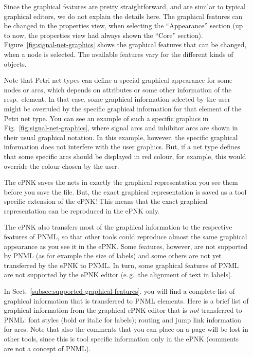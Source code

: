 Since the graphical features are pretty straightforward, and are similar
to typical graphical editors, we do not explain the details here. The
graphical features can be changed in the properties view, when selecting
the ``Appearance'' section (up to now, the properties view had always
shown the ``Core'' section). Figure~\ref{fig:signal-net-graphics} shows
the graphical features that can be changed, when a node is selected. The
available features vary for the different kinds of objects.

Note that Petri net types can define a special graphical appearance for
some nodes or arcs, which depends on attributes or some other information
of the resp.\ element. In that case, some graphical information selected by
the user might be overruled by the specific graphical information for that
element of the Petri net type. You can see an example of such a specific
graphics in Fig.~\ref{fig:signal-net-graphics}, where signal arcs and
inhibitor arcs are shown in their usual graphical notation. In this example,
however, the specific graphical information does not interfere with the
user graphics. But, if a net type defines that some specific arcs should
be displayed in red colour, for example, this would override the colour chosen
by the user.

The ePNK saves the nets in exactly the graphical representation you
see them before you save the file. But, the exact graphical representation
is saved as a tool specific extension of the ePNK! This means that the
exact graphical representation can be reproduced in the ePNK only.

The ePNK also transfers most of the graphical information to the respective
features of PNML, so that other tools could reproduce almost the same
graphical appearance as you see it in the ePNK. Some features, however,
are not supported by PNML (as for example the size of labels) and some
others are not yet transferred by the ePNK to PNML. In turn, some graphical
features of PNML are not supported by the ePNK editor (e.\,g.\ the alignment
of text in labels).

In Sect.~\ref{subsec:supported-graphical-features}, you will find a complete
list of graphical information that is transferred to PNML elements. Here
is a brief list of graphical information from the graphical ePNK editor
that is \emph{not} transferred to PNML: font styles (bold or italic for labels);
routing and jump link information for arcs. Note that also the comments that
you can place on a page will be lost in other tools, since this is tool specific
information only in the ePNK (comments are not a concept of PNML).

